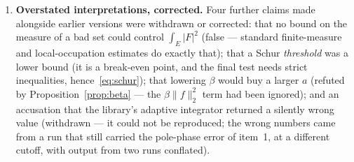 \documentclass[11pt,a4paper]{article}
\theoremstyle{definition}
\theoremstyle{remark}
\begin{document}
\begin{enumerate}
  power-saving sparsity bound on the near-resonant set of the prime comb --- is
  false, and is retracted in full: by continuous Kronecker--Weyl equidistribution
  that set has positive density, confirmed numerically here to four significant
  figures across four decades of $T$. The replacement is the empty-exterior gate
  of Section~\ref{sec:lower}, which needs no such estimate.
\item \textbf{Overstated interpretations, corrected.} Four further claims made
  alongside earlier versions were withdrawn or corrected: that no bound on the
  measure of a bad set could control $\int_E|F|^2$ (false --- standard
  finite-measure and local-occupation estimates do exactly that); that a Schur
  \emph{threshold} was a lower bound (it is a break-even point, and the final
  test needs strict inequalities, hence~\eqref{eq:schur}); that lowering $\beta$
  would buy a larger $a$ (refuted by Proposition~\ref{prop:beta} --- the
  $\beta\|f\|_2^2$ term had been ignored); and an accusation that the library's
  adaptive integrator returned a silently wrong value (withdrawn --- it could not
  be reproduced; the wrong numbers came from a run that still carried the
  pole-phase error of item~1, at a different cutoff, with output from two runs
  conflated).
\end{enumerate}
\end{document}
